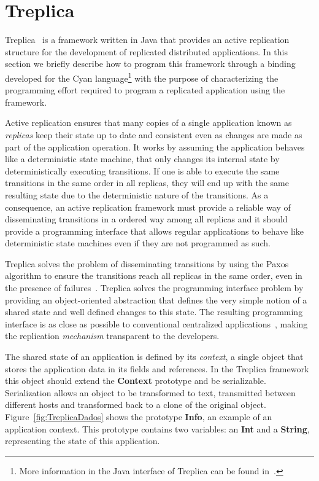 \documentclass[preprint,review]{elsarticle}
\newcommand{\srcstyle}[1]{\ttfamily\textbf{#1}\rmfamily}
\begin{document}
\section{Treplica}
\label{treplica}

Treplica~\cite{vieira08a} is a framework written in Java that provides
an  active replication  structure  for the  development of  replicated
distributed applications. In  this section we briefly  describe how to
program  this  framework through  a  binding  developed for  the  Cyan
language\footnote{More information  in the Java interface  of Treplica
  can be found  in~\cite{vieira2010implementation}.}  with the purpose
of  characterizing  the  programming  effort  required  to  program  a
replicated application using the framework.

Active replication  ensures that many  copies of a  single application
known as  \emph{replicas} keep their  state up to date  and consistent
even as  changes are made  as part  of the application  operation.  It
works by assuming  the application behaves like  a deterministic state
machine,  that only  changes its  internal state  by deterministically
executing transitions.  If one is able to execute the same transitions
in the  same order  in all replicas,  they will end  up with  the same
resulting state due to the deterministic nature of the transitions. As
a consequence, an active replication framework must provide a reliable
way of disseminating  transitions in a ordered way  among all replicas
and  it should  provide a  programming interface  that allows  regular
applications to behave like deterministic  state machines even if they
are not programmed as such.

Treplica solves the problem of  disseminating transitions by using the
Paxos algorithm  to ensure the  transitions reach all replicas  in the
same order,  even in the presence  of failures~\cite{lamport2006fast}.
Treplica  solves the  programming  interface problem  by providing  an
object-oriented abstraction that  defines the very simple  notion of a
shared state  and well defined  changes to this state.   The resulting
programming  interface  is  as   close  as  possible  to  conventional
centralized  applications~\cite{vieira08a},   making  the  replication
\emph{mechanism} transparent to the developers.

The shared state of an application is defined by its \emph{context}, a
single  object that  stores the  application  data in  its fields  and
references.  In the  Treplica framework this object  should extend the
\srcstyle{Context}  prototype  and   be  serializable.   Serialization
allows  an  object to  be  transformed  to text,  transmitted  between
different  hosts and  transformed  back  to a  clone  of the  original
object.     Figure~\ref{fig:TreplicaDados}    shows   the    prototype
\srcstyle{Info}, an example of  an application context. This prototype
contains  two variables:  an \srcstyle{Int}  and a  \srcstyle{String},
representing the state of this application.
\end{document}
